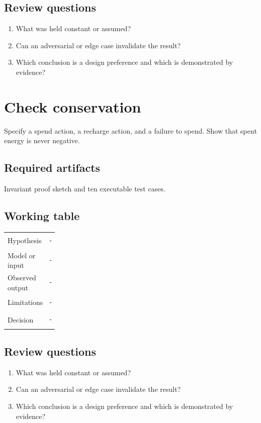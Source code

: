 \documentclass[11pt]{article}
\begin{document}
\subsection{Review questions}
\begin{enumerate}
\item What was held constant or assumed?
\item Can an adversarial or edge case invalidate the result?
\item Which conclusion is a design preference and which is demonstrated by evidence?
\end{enumerate}

\section{Check conservation}
Specify a spend action, a recharge action, and a failure to spend. Show that spent energy is never negative.


\subsection{Required artifacts}
Invariant proof sketch and ten executable test cases.


\subsection{Working table}
\begin{tabularx}{\linewidth}{@{}p{0.20\linewidth}X@{}}\toprule
Hypothesis & \rule{0.90\linewidth}{0.4pt}\\[0.35cm]
Model or input & \rule{0.90\linewidth}{0.4pt}\\[0.35cm]
Observed output & \rule{0.90\linewidth}{0.4pt}\\[0.35cm]
Limitations & \rule{0.90\linewidth}{0.4pt}\\[0.35cm]
Decision & \rule{0.90\linewidth}{0.4pt}\\\bottomrule\end{tabularx}

\subsection{Review questions}
\begin{enumerate}
\item What was held constant or assumed?
\item Can an adversarial or edge case invalidate the result?
\item Which conclusion is a design preference and which is demonstrated by evidence?
\end{enumerate}
\end{document}
